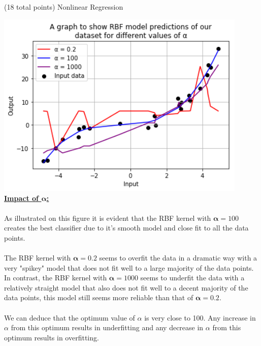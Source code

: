 \documentclass[12pt]{article}
\begin{document}
\begin{question}{(18 total points) Nonlinear Regression}
\begin{subquestion}
\begin{answerbox}{45em}
\includegraphics [width=0.9\textwidth]{images/q2d-graph.png}\\
\large{\textbf{\underline{Impact of $\mathbf{\alpha}$:}}}\\
\\
\normalsize{
As illustrated on this figure it is evident that the RBF kernel with $\mathbf{\alpha} = 100$ creates the best classifier due to it's smooth model and close fit to all the data points.\\
\\
The RBF kernel with $\mathbf{\alpha} = 0.2$ seems to overfit the data in a dramatic way with a very "spikey" model that does not fit well to a large majority of the data points. In contrast, the RBF kernel with $\mathbf{\alpha} = 1000$ seems to underfit the data with a relatively straight model that also does not fit well to a decent majority of the data points, this model still seems more reliable than that of $\mathbf{\alpha} = 0.2$.\\
\\
We can deduce that the optimum value of $\alpha$ is very close to 100. Any increase in $\alpha$ from this optimum results in underfitting and any decrease in $\alpha$ from this optimum results in overfitting. 
}
\end{answerbox}



\end{subquestion}



\end{question}
\end{document}
